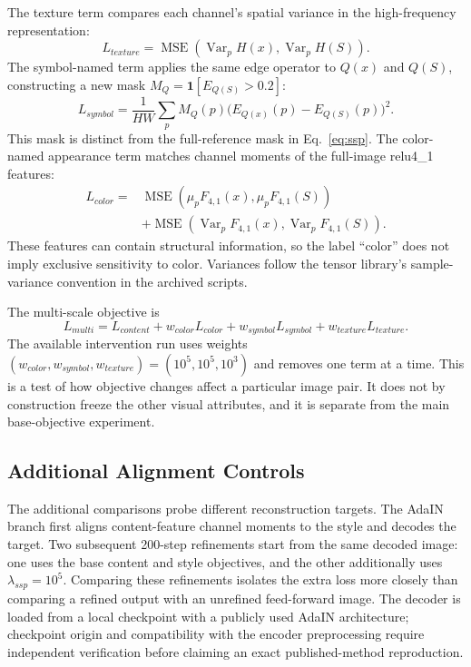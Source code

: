 The texture term compares each channel's spatial variance in the high-frequency representation:
\begin{equation}
L_{texture}=\operatorname{MSE}(\operatorname{Var}_{p}H(x),\operatorname{Var}_{p}H(S)).
\end{equation}
The symbol-named term applies the same edge operator to $Q(x)$ and $Q(S)$, constructing a new mask $M_Q=\mathbf{1}[E_{Q(S)}>0.2]$:
\begin{equation}
L_{symbol}=\frac{1}{HW}\sum_p M_Q(p)\big(E_{Q(x)}(p)-E_{Q(S)}(p)\big)^2.
\end{equation}
This mask is distinct from the full-reference mask in Eq.~\ref{eq:ssp}. The color-named appearance term matches channel moments of the full-image relu4\_1 features:
\begin{align}
L_{color}={}&\operatorname{MSE}(\mu_p F_{4,1}(x),\mu_p F_{4,1}(S))\nonumber\\
&+\operatorname{MSE}(\operatorname{Var}_p F_{4,1}(x),\operatorname{Var}_p F_{4,1}(S)).
\end{align}
These features can contain structural information, so the label ``color'' does not imply exclusive sensitivity to color. Variances follow the tensor library's sample-variance convention in the archived scripts.

The multi-scale objective is
\begin{equation}
L_{multi}=L_{content}+w_{color}L_{color}+w_{symbol}L_{symbol}+w_{texture}L_{texture}.
\end{equation}
The available intervention run uses weights $(w_{color},w_{symbol},w_{texture})=(10^5,10^5,10^3)$ and removes one term at a time. This is a test of how objective changes affect a particular image pair. It does not by construction freeze the other visual attributes, and it is separate from the main base-objective experiment.

\subsection{Additional Alignment Controls}
The additional comparisons probe different reconstruction targets. The AdaIN branch first aligns content-feature channel moments to the style and decodes the target. Two subsequent 200-step refinements start from the same decoded image: one uses the base content and style objectives, and the other additionally uses $\lambda_{ssp}=10^5$. Comparing these refinements isolates the extra loss more closely than comparing a refined output with an unrefined feed-forward image. The decoder is loaded from a local checkpoint with a publicly used AdaIN architecture; checkpoint origin and compatibility with the encoder preprocessing require independent verification before claiming an exact published-method reproduction.

